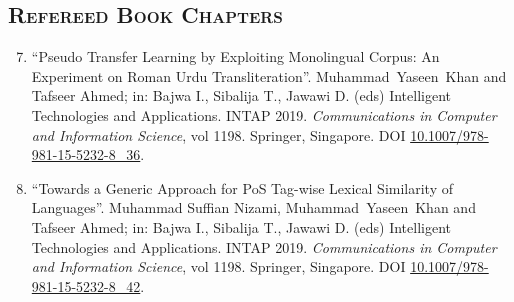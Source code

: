 \documentclass[a4paper, 10pt]{article}
\begin{document}
\subsection*{\normalfont\textsc{Refereed Book Chapters}}
\begin{enumerate}
\setcounter{enumi}{6}
\itemsep-4pt 
 \item ``Pseudo Transfer Learning by Exploiting Monolingual Corpus: An Experiment on Roman Urdu Transliteration''. \textcolor{NavyBlue}{Muhammad~Yaseen~Khan} and Tafseer Ahmed; in: Bajwa I., Sibalija T., Jawawi D. (eds) Intelligent Technologies and Applications. INTAP 2019. \emph{Communications in Computer and Information Science}, vol 1198. Springer, Singapore. DOI \href{https://doi.org/10.1007/978-981-15-5232-8_36}{10.1007/978-981-15-5232-8\_36}.
  
   \item ``Towards a Generic Approach for PoS Tag-wise Lexical Similarity of Languages''. Muhammad Suffian Nizami, \textcolor{NavyBlue}{Muhammad~Yaseen~Khan} and Tafseer Ahmed; in: Bajwa I., Sibalija T., Jawawi D. (eds) Intelligent Technologies and Applications. INTAP 2019. \emph{Communications in Computer and Information Science}, vol 1198. Springer, Singapore. DOI \href{https://doi.org/10.1007/978-981-15-5232-8_42}{10.1007/978-981-15-5232-8\_42}.
   
 \end{enumerate}
\end{document}
